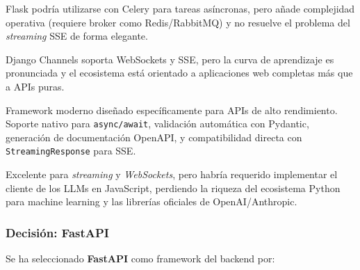 \begin{description}[style=nextline, leftmargin=1cm, font=\bfseries]
    \item[Flask + Celery]
    Flask podría utilizarse con Celery para tareas asíncronas, pero añade complejidad operativa (requiere broker como Redis/RabbitMQ) y no resuelve el problema del \textit{streaming} SSE de forma elegante.
    
    \item[Django + Channels]
    Django Channels soporta WebSockets y SSE, pero la curva de aprendizaje es pronunciada y el ecosistema está orientado a aplicaciones web completas más que a APIs puras.
    
    \item[FastAPI]
    Framework moderno diseñado específicamente para APIs de alto rendimiento. Soporte nativo para \texttt{async/await}, validación automática con Pydantic, generación de documentación OpenAPI, y compatibilidad directa con \texttt{StreamingResponse} para SSE.
    
    \item[Express.js (Node.js)]
    Excelente para \textit{streaming} y \textit{WebSockets}, pero habría requerido implementar el cliente de los LLMs en JavaScript, perdiendo la riqueza del ecosistema Python para machine learning y las librerías oficiales de OpenAI/Anthropic.
\end{description}

\subsubsection{Decisión: FastAPI}

Se ha seleccionado \textbf{FastAPI} como framework del backend por:

